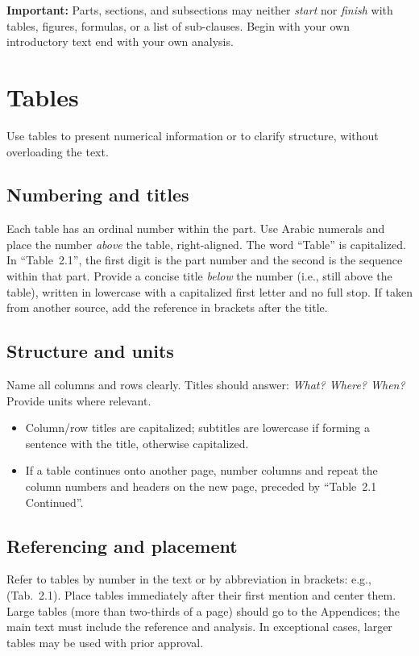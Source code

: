 \textbf{Important:} Parts, sections, and subsections may neither \emph{start} nor \emph{finish} with tables, figures, formulas, or a list of sub-clauses. Begin with your own introductory text end with your own analysis.

\section{Tables}

Use tables to present numerical information or to clarify structure, without overloading the text.

\subsection*{Numbering and titles}
Each table has an ordinal number within the part. Use Arabic numerals and place the number \emph{above} the table, right-aligned. The word ``Table'' is capitalized. In ``Table~2.1'', the first digit is the part number and the second is the sequence within that part. Provide a concise title \emph{below} the number (i.e., still above the table), written in lowercase with a capitalized first letter and no full stop. If taken from another source, add the reference in brackets after the title.

\subsection*{Structure and units}
Name all columns and rows clearly. Titles should answer: \emph{What? Where? When?} Provide units where relevant.
\begin{itemize}
  \item Column/row titles are capitalized; subtitles are lowercase if forming a sentence with the title, otherwise capitalized.
  \item If a table continues onto another page, number columns and repeat the column numbers and headers on the new page, preceded by ``Table~2.1 Continued''.
\end{itemize}

\subsection*{Referencing and placement}
Refer to tables by number in the text or by abbreviation in brackets: e.g., (Tab.~2.1). Place tables immediately after their first mention and center them. Large tables (more than two-thirds of a page) should go to the Appendices; the main text must include the reference and analysis. In exceptional cases, larger tables may be used with prior approval.

